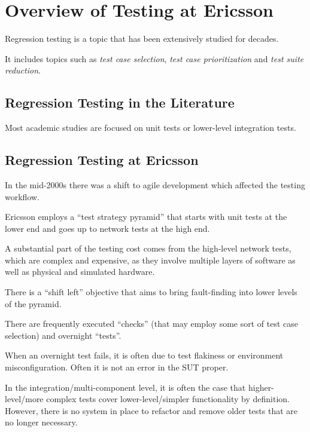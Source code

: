\section{Overview of Testing at Ericsson}\label{sec:ind_overview}

Regression testing is a topic that has been extensively studied for decades.

It includes topics such as \textit{test case selection}, \textit{test case prioritization} and \textit{test suite reduction}.



\subsection{Regression Testing in the Literature}

Most academic studies are focused on unit tests or lower-level integration tests.

\subsection{Regression Testing at Ericsson}

In the mid-2000s there was a shift to agile development which affected the testing workflow.

Ericsson employs a ``test strategy pyramid'' that starts with unit tests at the lower end and goes up to network tests at the high end.

A substantial part of the testing cost comes from the high-level network tests, which are complex and expensive, as they involve multiple layers of software as well as physical and simulated hardware.

There is a ``shift left'' objective that aims to bring fault-finding into lower levels of the pyramid.

There are frequently executed ``checks'' (that may employ some sort of test case selection) and overnight ``tests''.

When an overnight test fails, it is often due to test flakiness or environment misconfiguration. Often it is not an error in the SUT proper.

In the integration/multi-component level, it is often the case that higher-level/more complex tests cover lower-level/simpler functionality by definition. However, there is no system in place to refactor and remove older tests that are no longer necessary.
